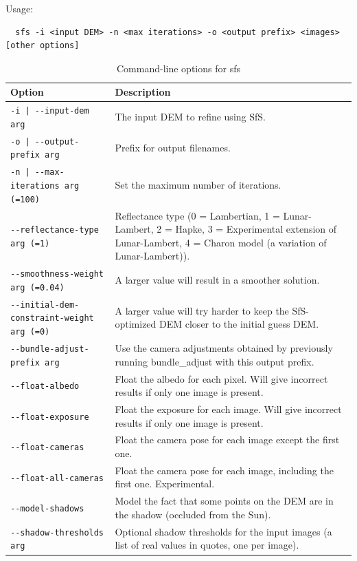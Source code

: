 Usage:
\begin{verbatim}
  sfs -i <input DEM> -n <max iterations> -o <output prefix> <images> [other options]
\end{verbatim}

\begin{longtable}{|l|p{7.5cm}|}
\caption{Command-line options for sfs}
\label{tbl:sfs}
\endfirsthead
\endhead
\endfoot
\endlastfoot
\hline
Option & Description \\ \hline \hline
\texttt{-i | -\/-input-dem  arg} & The input DEM to refine using SfS.\\ \hline
\texttt{-o | -\/-output-prefix  arg} & Prefix for output filenames.\\ \hline
\texttt{-n | -\/-max-iterations  arg (=100)} & Set the maximum number of iterations.\\ \hline
\texttt{-\/-reflectance-type arg (=1)} & Reflectance type (0 = Lambertian, 1 = Lunar-Lambert, 2 = Hapke, 3 = Experimental extension of Lunar-Lambert, 4 = Charon model (a variation of Lunar-Lambert)).\\ \hline
\texttt{-\/-smoothness-weight arg (=0.04)} & A larger value will result in a smoother solution.\\ \hline
\texttt{-\/-initial-dem-constraint-weight arg (=0)} & A larger value will try harder to keep the SfS-optimized DEM closer to the initial guess DEM.\\ \hline
\texttt{-\/-bundle-adjust-prefix arg} & Use the camera adjustments obtained by previously running bundle\_adjust with this output prefix.\\ \hline
\texttt{-\/-float-albedo} & Float the albedo for each pixel. Will give incorrect results if only one image is present.\\ \hline
\texttt{-\/-float-exposure} & Float the exposure for each image. Will give incorrect results if only one image is present.\\ \hline
\texttt{-\/-float-cameras} & Float the camera pose for each image except the first one.\\ \hline
\texttt{-\/-float-all-cameras} & Float the camera pose for each image, including the first one. Experimental.\\ \hline
\texttt{-\/-model-shadows} & Model the fact that some points on the DEM are in the shadow (occluded from the Sun).\\ \hline
\texttt{-\/-shadow-thresholds arg} & Optional shadow thresholds for the input images (a list of real values in quotes, one per image).\\ \hline

\end{longtable}
